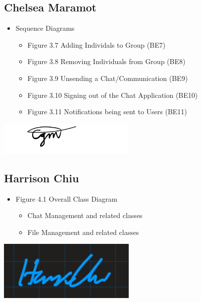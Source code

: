 \documentclass[]{article}
\begin{document}
\subsection{Chelsea Maramot}
\label{subsec:chelsea_maramot}
\begin{itemize}
	\item Sequence Diagrams
	      \begin{itemize}
		      \item Figure 3.7 Adding Individals to Group (BE7)
		      \item Figure 3.8 Removing Individuals from Group (BE8)
		      \item Figure 3.9 Unsending a Chat/Communication (BE9)
		      \item Figure 3.10 Signing out of the Chat Application (BE10)
		      \item Figure 3.11 Notifications being sent to Users (BE11)
	      \end{itemize}
\end{itemize}
\includegraphics[width=0.5\textwidth]{chelsea.png}

\subsection{Harrison Chiu}
\label{subsec:harrison_chiu}
\begin{itemize}
	\item Figure 4.1 Overall Class Diagram
	      \begin{itemize}
		      \item Chat Management and related classes
		      \item File Management and related classes
	      \end{itemize}
\end{itemize}
\includegraphics[width=0.5\textwidth]{harrison.png}
\end{document}
